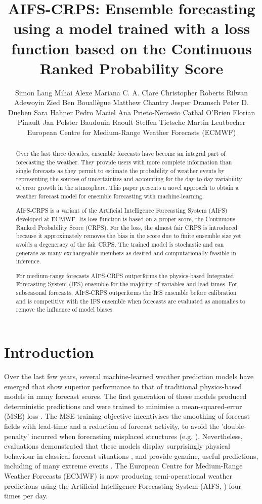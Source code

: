 \documentclass{article}
\title{AIFS-CRPS: Ensemble forecasting using a model trained with a loss function based on the Continuous Ranked Probability Score}
\author{
    Simon Lang
    \And Mihai Alexe
    \And Mariana C. A. Clare
    \And Christopher Roberts
    \And Rilwan Adewoyin
    \And Zied {Ben Bouall\`egue}
    \And Matthew Chantry
    \And Jesper Dramsch
    \And Peter D. Dueben
    \And Sara Hahner
    \And Pedro Maciel
    \And Ana Prieto-Nemesio
    \And Cathal O'Brien
    \And Florian Pinault
    \And Jan Polster
    \And Baudouin Raoult
    \And Steffen Tietsche
    \And Martin Leutbecher
    \And European Centre for Medium-Range Weather Forecasts (ECMWF)
}
\begin{document}
\maketitle

\begin{abstract}
Over the last three decades, ensemble forecasts have become an integral part of forecasting the weather. They provide users with more complete information than single forecasts as they permit to estimate the probability of weather events by representing the sources of uncertainties and  accounting for the day-to-day variability of error growth in the atmosphere. This paper presents a novel approach to obtain a weather forecast model for ensemble forecasting with machine-learning.
 
AIFS-CRPS is a variant of the Artificial Intelligence Forecasting System (AIFS) developed at ECMWF. Its loss function is based on a proper score, the Continuous Ranked Probability Score (CRPS). For the loss, the almost fair CRPS is introduced because it approximately removes the bias in the score due to finite ensemble size yet avoids a degeneracy of the fair CRPS. 
The trained model is stochastic and can generate as many exchangeable members as desired and computationally feasible in inference.

For medium-range forecasts AIFS-CRPS outperforms the physics-based Integrated Forecasting System (IFS) ensemble for the majority of variables and lead times. For subseasonal forecasts, AIFS-CRPS outperforms the IFS ensemble before calibration and is competitive with the IFS ensemble when forecasts are evaluated as anomalies to remove the influence of model biases.
\end{abstract}

\section{Introduction}
Over the last few years, several machine-learned weather prediction models have emerged that show superior performance to that of traditional physics-based models in many forecast scores. The first generation of these models produced deterministic predictions and were trained to minimise a mean-squared-error (MSE) loss \citep{pathak2022fourcastnet,pangu2023,lam2022graphcast,Chen2023,lang2024aifs}. The MSE training objective incentivises the smoothing of forecast fields with lead-time and a reduction of forecast activity, to avoid the 'double-penalty' incurred when forecasting misplaced structures (e.g. \cite{Hoffman1995, ebertdouble}). Nevertheless, evaluations demonstrated that these models display surprisingly physical behaviour in classical forecast situations \citep{hakim2024dynamical}, and provide genuine, useful predictions, including of many extreme events \citep{benbouallegue2023rise}. The European Centre for Medium-Range Weather Forecasts (ECMWF) is now producing semi-operational weather predictions using the Artificial Intelligence Forecasting System (AIFS, \cite{lang2024aifs}) four times per day.
\end{document}
